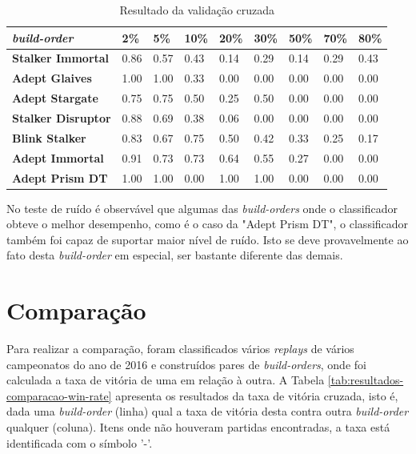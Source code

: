 \begin{table}[H]
\centering
\caption{Resultado da validação cruzada}
\label{tab:resultados-cruzada}
\begin{tabular}{l|l|l|l|l|l|l|l|l}
	\textit{\Gls{build-order}} 		& 2\%  & 5\%  & 10\% & 20\% & 30\% & 50\% & 70\% & 80\% \\ \hline
	\textbf{Stalker Immortal} 	& 0.86 & 0.57 & 0.43 & 0.14 & 0.29 & 0.14 & 0.29 & 0.43 \\
	\textbf{Adept Glaives} 		& 1.00 & 1.00 & 0.33 & 0.00 & 0.00 & 0.00 & 0.00 & 0.00 \\
	\textbf{Adept Stargate} 		& 0.75 & 0.75 & 0.50 & 0.25 & 0.50 & 0.00 & 0.00 & 0.00 \\
	\textbf{Stalker Disruptor} 	& 0.88 & 0.69 & 0.38 & 0.06 & 0.00 & 0.00 & 0.00 & 0.00 \\
	\textbf{Blink Stalker} 		& 0.83 & 0.67 & 0.75 & 0.50 & 0.42 & 0.33 & 0.25 & 0.17 \\
	\textbf{Adept Immortal} 		& 0.91 & 0.73 & 0.73 & 0.64 & 0.55 & 0.27 & 0.00 & 0.00 \\
	\textbf{Adept Prism DT} 		& 1.00 & 1.00 & 0.00 & 1.00 & 1.00 & 0.00 & 0.00 & 0.00 \\
\end{tabular}
\end{table}

No teste de ruído é observável que algumas das \textit{\glspl{build-order}} onde o classificador obteve o melhor desempenho, como é o caso da "Adept Prism DT", o classificador também foi capaz de suportar maior nível de ruído. Isto se deve provavelmente ao fato desta \textit{\gls{build-order}} em especial, ser bastante diferente das demais.

		\section{Comparação}

Para realizar a comparação, foram classificados vários \textit{\glspl{replay}} de vários campeonatos do ano de 2016 e construídos pares de \textit{\glspl{build-order}}, onde foi calculada a taxa de vitória de uma em relação à outra. A Tabela \ref{tab:resultados-comparacao-win-rate} apresenta os resultados da taxa de vitória cruzada, isto é, dada uma \textit{\gls{build-order}} (linha) qual a taxa de vitória desta contra outra \textit{\gls{build-order}} qualquer (coluna). Itens onde não houveram partidas encontradas, a taxa está identificada com o símbolo '-'.

